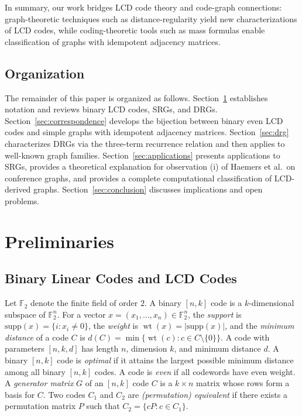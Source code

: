 \documentclass[a4paper,11pt]{article}
\theoremstyle{remark}
\newcommand{\FF}{\mathbb{F}}
\DeclareMathOperator{\wt}{wt}
\begin{document}
In summary, our work bridges LCD code theory and code-graph connections: graph-theoretic techniques such as distance-regularity yield new characterizations of LCD codes, while coding-theoretic tools such as mass formulas enable classification of graphs with idempotent adjacency matrices.

\subsection{Organization}

The remainder of this paper is organized as follows. Section~\ref{sec:prelim} establishes notation and reviews binary LCD codes, SRGs, and DRGs. Section~\ref{sec:correspondence} develops the bijection between binary even LCD codes and simple graphs with idempotent adjacency matrices. Section~\ref{sec:drg} characterizes DRGs via the three-term recurrence relation and then applies to well-known graph families. Section~\ref{sec:applications} presents applications to SRGs, provides a theoretical explanation for observation (i) of Haemers et al.\ on conference graphs, and provides a complete computational classification of LCD-derived graphs. Section~\ref{sec:conclusion} discusses implications and open problems.

\section{Preliminaries}\label{sec:prelim}

\subsection{Binary Linear Codes and LCD Codes}

Let $\FF_2$ denote the finite field of order $2$.
A binary $[n,k]$ code is a $k$-dimensional subspace of $\FF_2^n$. For a vector $x = (x_1,\ldots,x_n) \in \FF_2^n$, the \emph{support} is $\text{supp}(x) = \{i : x_i \neq 0\}$, the \emph{weight} is $\wt(x) = |\text{supp}(x)|$, and the \emph{minimum distance} of a code $C$ is $d(C) = \min\{\wt(c) : c \in C \setminus \{0\}\}$.
A code with parameters $[n,k,d]$ has length $n$, dimension $k$, and minimum distance $d$.
A binary $[n,k]$ code is \emph{optimal} if it attains the largest possible minimum distance among all binary $[n,k]$ codes.
A code is \emph{even} if all codewords have even weight.
A \emph{generator matrix} $G$ of an $[n,k]$ code $C$ is a $k \times n$ matrix whose rows form a basis for $C$.
Two codes $C_1$ and $C_2$ are \emph{(permutation) equivalent} if there exists a permutation matrix $P$ such that $C_2 = \{cP : c \in C_1\}$.
\end{document}
